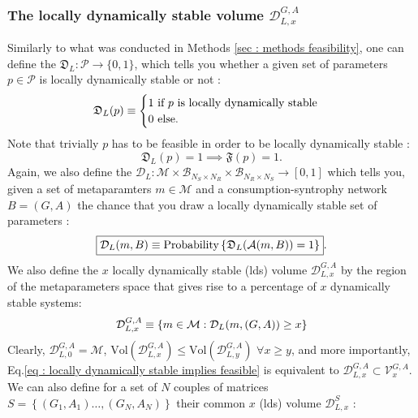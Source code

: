 \documentclass[12pt, titlepage]{report}
\begin{document}
\subsubsection{The locally dynamically stable volume $\mathcal{D}^{G,A}_{L,x}$} \label{sec : dynamical stability methods locally dynamically stable region}
Similarly to what was conducted in Methods \ref{sec : methods feasibility}, one can define the  $\mathfrak{D}_L : \mathcal{P} \rightarrow \{
0,1\}$, which tells you whether a given set of parameters $p \in \mathcal{P}$ is locally dynamically stable or not :
\begin{equation}
\mathfrak{D}_L(p)\equiv\begin{cases}
1 \text{ if } p \text{ is locally dynamically stable} \\
0 \text{ else.}
\end{cases}
\end{equation}
Note that trivially $p$ has to be feasible in order to be locally dynamically stable :
\begin{equation}
\mathfrak{D}_L(p)=1 \implies \mathfrak{F}(p)=1. \label{eq : locally dynamically stable implies feasible}
\end{equation}
Again, we also define the  $\mathcal{D}_L : \mathcal{M} \times \mathcal{B}_{N_S \times N_R} \times \mathcal{B}_{N_R \times N_S} \rightarrow [0,1]$ which tells you, given a set of metaparamters $m \in \mathcal{M}$ and a consumption-syntrophy network $B=(G,A)$ the chance that you draw a locally dynamically stable set of parameters :
\begin{equation}
\boxed{\mathcal{D}_L(m, B)\equiv\text{Probability}\left\{\mathfrak{D}_L(\mathcal{A}(m, B))=1\right\}}.
\end{equation}
We also define the $x$ locally dynamically stable (lds) volume $\mathcal{D}_{L,x}^{G,A}$ by the region of the metaparameters space that gives rise to a percentage of $x$ dynamically stable systems:
\begin{equation}
\mathcal{D}_{L,x}^{G,A} \equiv \left\{m \in \mathcal{M} : \mathcal{D}_L(m, (G,A)) \geq x \right\}
\end{equation}
Clearly, $\mathcal{D}_{L,0}^{G,A}=\mathcal{M}$, $\text{Vol}\left(\mathcal{D}_{L,x}^{G,A}\right) \leq \text{Vol}\left(\mathcal{D}_{L,y}^{G,A}\right)$ $\forall x \geq y$, and more importantly, Eq.\eqref{eq : locally dynamically stable implies feasible} is equivalent to $\mathcal{D}_{L,x}^{G,A} \subset \mathcal{V}_x^{G,A}$. We can also define for a set of $N$ couples of matrices $S=\left\{(G_1, A_1) \dots, (G_N, A_N)\right\}$ their common $x$ (lds) volume $\mathcal{D}_{L,x}^S$ :
\end{document}
